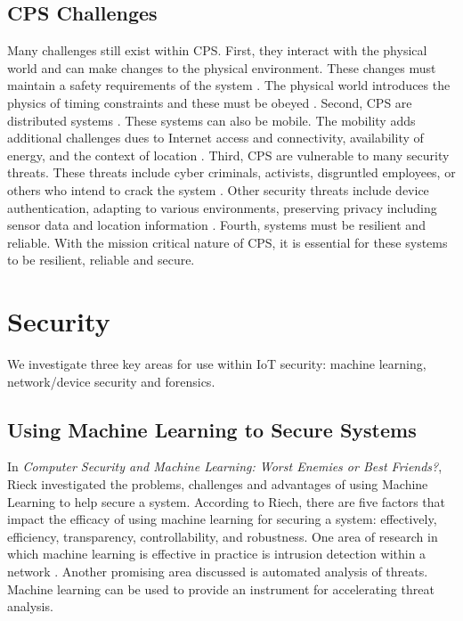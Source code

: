 \documentclass[../main.tex]{subfiles}
\begin{document}
\subsection{CPS Challenges}

Many challenges still exist within CPS. First, they interact with the physical world and can make changes to the physical environment. These changes must maintain a safety requirements of the system \cite{6899124}. The physical world introduces the physics of timing constraints and these must be obeyed \cite{6899124}. Second, CPS are distributed systems \cite{6899124,shi2011survey}. These systems can also be mobile. The mobility adds additional challenges dues to Internet access and connectivity, availability of energy, and the context of location \cite{7471348}. Third, CPS are vulnerable to many security threats. These threats include cyber criminals, activists, disgruntled employees, or others who intend to crack the system \cite{cardenas2009challenges}. Other security threats include device authentication, adapting to various environments, preserving privacy including sensor data and location information \cite{7471348,cardenas2009challenges,baheti2011cyber}. Fourth, systems must be resilient and reliable. With the mission critical nature of CPS, it is essential for these systems to be resilient, reliable and secure.
 

\section{Security}

We investigate three key areas for use within IoT security: machine learning, network/device security and forensics.


\subsection{Using Machine Learning to Secure Systems}

In \textit{Computer Security and Machine Learning:
Worst Enemies or Best Friends?}, Rieck investigated the problems, challenges and advantages of using Machine Learning to help secure a system\cite{6092778}. According to Riech, there are five factors that impact the efficacy of using machine learning for securing a system: effectively, efficiency, transparency, controllability, and robustness. One area of research in which machine learning is effective in practice is intrusion detection within a network \cite{6092778}. Another promising area discussed is automated analysis of threats. Machine learning can be used to provide an instrument for accelerating threat analysis. 
\end{document}
